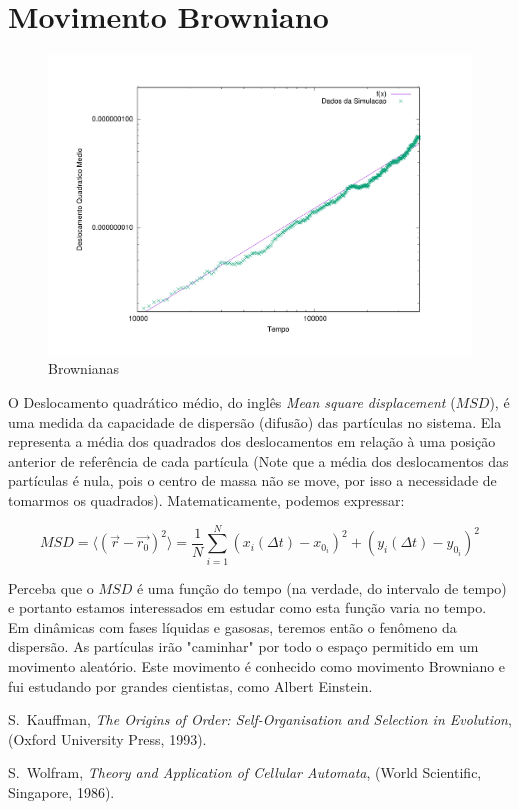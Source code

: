 \section{Movimento Browniano} 

\begin{figure}[hbtp]
\begin{center}
\includegraphics[width=12cm]{browniano.pdf}
\caption{Brownianas}
\label{fig}
\end{center}
\end{figure}

O Deslocamento quadrático médio, do inglês \emph{Mean square displacement} ($MSD$), é uma medida da capacidade de dispersão (difusão) das partículas no sistema. Ela representa a média dos quadrados dos deslocamentos em relação à uma posição anterior de referência de cada partícula (Note que a média dos deslocamentos das partículas é nula, pois o centro de massa não se move, por isso a necessidade de tomarmos os quadrados). Matematicamente, podemos expressar:

$$MSD = \langle (\vec{r} - \vec{r_0})^2 \rangle = \frac{1}{N} \sum_{i=1}^{N}(x_i(\Delta{t}) - x_0_i)^2 +  (y_i(\Delta{t}) - y_0_i)^2$$

Perceba que o $MSD$ é uma função do tempo (na verdade, do intervalo de tempo) e portanto estamos interessados em estudar como esta função varia no tempo. Em dinâmicas com fases líquidas e gasosas, teremos então o fenômeno da dispersão. As partículas irão "caminhar" por todo o espaço permitido em um movimento aleatório. Este movimento é conhecido como movimento Browniano e fui estudando por grandes cientistas, como Albert Einstein.

\begin{thebibliography}{99}

S.~Kauffman, {\em The Origins of Order: Self-Organisation and
Selection in Evolution}, (Oxford University Press, 1993).

S.~Wolfram, {\em Theory and Application of Cellular Automata},
(World Scientific, Singapore, 1986).

\end{thebibliography}



